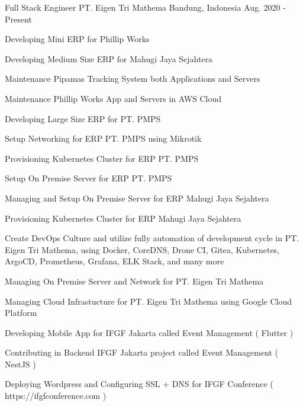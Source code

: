 \begin{cventries}
  \cventry
    {Full Stack Engineer} %
    {PT. Eigen Tri Mathema} %
    {Bandung, Indonesia} %
    {Aug. 2020 - Present} %
    {
      \begin{cvitems} %
        \item {Developing Mini ERP for Phillip Works}
        \item {Developing Medium Size ERP for Mahugi Jaya Sejahtera}
        \item {Maintenance Pipamas Tracking System both Applications and Servers}
        \item {Maintenance Phillip Works App and Servers in AWS Cloud}
        \item {Developing Large Size ERP for PT. PMPS}
        \item {Setup Networking for ERP PT. PMPS using Mikrotik}
        \item {Provisioning Kubernetes Cluster for ERP PT. PMPS}
        \item {Setup On Premise Server for ERP PT. PMPS}
        \item {Managing and Setup On Premise Server for ERP Mahugi Jaya Sejahtera}
        \item {Provisioning Kubernetes Cluster for ERP Mahugi Jaya Sejahtera}
        \item {Create DevOps Culture and utilize fully automation of development cycle in PT. Eigen Tri Mathema, using Docker, CoreDNS, Drone CI, Gitea, Kubernetes, ArgoCD, Prometheus, Grafana, ELK Stack, and many more}
        \item {Managing On Premise Server and Network for PT. Eigen Tri Mathema}
        \item {Managing Cloud Infrastucture for PT. Eigen Tri Mathema using Google Cloud Platform}
        \item {Developing Mobile App for IFGF Jakarta called Event Management ( Flutter )}
        \item {Contributing in Backend IFGF Jakarta project called Event Management ( NestJS )}
        \item {Deploying Wordpress and Configuring SSL + DNS for IFGF Conference ( https://ifgfconference.com )}
      \end{cvitems}
    }


\end{cventries}
